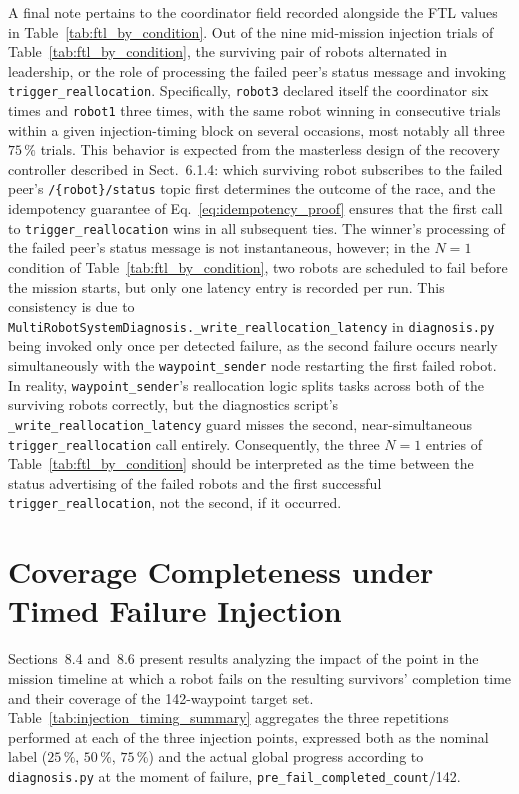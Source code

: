 A final note pertains to the coordinator field recorded alongside the FTL values in Table~\ref{tab:ftl_by_condition}. Out of the nine mid-mission injection trials of Table~\ref{tab:ftl_by_condition}, the surviving pair of robots alternated in leadership, or the role of processing the failed peer's status message and invoking \texttt{trigger\_reallocation}. Specifically, \texttt{robot3} declared itself the coordinator six times and \texttt{robot1} three times, with the same robot winning in consecutive trials within a given injection-timing block on several occasions, most notably all three $75\,\%$ trials. This behavior is expected from the masterless design of the recovery controller described in Sect.~6.1.4: which surviving robot subscribes to the failed peer's \texttt{/\{robot\}/status} topic first determines the outcome of the race, and the idempotency guarantee of Eq.~\eqref{eq:idempotency_proof} ensures that the first call to \texttt{trigger\_reallocation} wins in all subsequent ties. The winner's processing of the failed peer's status message is not instantaneous, however; in the $N=1$ condition of Table~\ref{tab:ftl_by_condition}, two robots are scheduled to fail before the mission starts, but only one latency entry is recorded per run. This consistency is due to \texttt{MultiRobotSystemDiagnosis.\_write\_reallocation\_latency} in \texttt{diagnosis.py} being invoked only once per detected failure, as the second failure occurs nearly simultaneously with the \texttt{waypoint\_sender} node restarting the first failed robot. In reality, \texttt{waypoint\_sender}'s reallocation logic splits tasks across both of the surviving robots correctly, but the diagnostics script's \texttt{\_write\_reallocation\_latency} guard misses the second, near-simultaneous \texttt{trigger\_reallocation} call entirely. Consequently, the three $N=1$ entries of Table~\ref{tab:ftl_by_condition} should be interpreted as the time between the status advertising of the failed robots and the first successful \texttt{trigger\_reallocation}, not the second, if it occurred.

\section{Coverage Completeness under Timed Failure Injection}

Sections~8.4 and~8.6 present results analyzing the impact of the point in the mission timeline at which a robot fails on the resulting survivors' completion time and their coverage of the 142-waypoint target set. Table~\ref{tab:injection_timing_summary} aggregates the three repetitions performed at each of the three injection points, expressed both as the nominal label ($25\,\%$, $50\,\%$, $75\,\%$) and the actual global progress according to \texttt{diagnosis.py} at the moment of failure, \texttt{pre\_fail\_completed\_count}/142.

